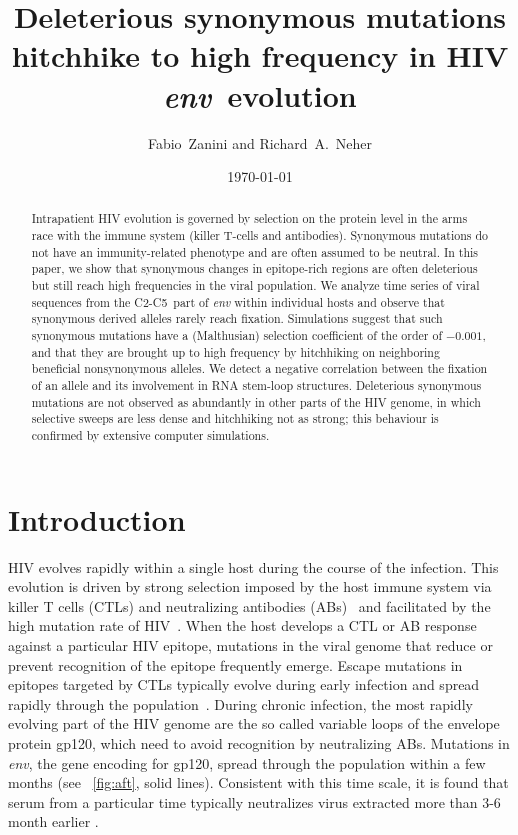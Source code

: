 \documentclass[rmp, twocolumn]{revtex4}
\newcommand{\env}{\textit{env}}
\newcommand{\shankaregion}{C2-C5}
\newcommand{\Author}{Fabio~Zanini and Richard~A.~Neher}
\newcommand{\Title}{Deleterious synonymous mutations hitchhike to high frequency in HIV \env~evolution}
\begin{document}
\title{\Title}
\author{\Author}
\date{\today}

\begin{abstract}
\noindent
Intrapatient HIV evolution is governed by selection on the protein level in the
arms race with the immune system (killer T-cells and antibodies). Synonymous
mutations do not have an immunity-related phenotype and are often assumed to be
neutral. In this paper, we show that synonymous changes in epitope-rich regions
are often deleterious but still reach high frequencies in the viral population.  We analyze time
series of viral sequences from the \shankaregion~part of {\it env} within individual
hosts and observe that synonymous derived alleles rarely reach fixation.
Simulations suggest that such synonymous mutations
have a (Malthusian) selection coefficient of the order of $-0.001$, and that
they are brought up to high frequency by hitchhiking on neighboring beneficial
nonsynonymous alleles. We detect a negative correlation between the fixation of an allele and
its involvement in RNA stem-loop structures.
Deleterious synonymous mutations are not observed as abundantly in other parts of the HIV genome, in which
selective sweeps are less dense and hitchhiking not as strong; this behaviour is
confirmed by extensive computer simulations.

\end{abstract}
\maketitle

\section{Introduction}

HIV evolves rapidly within a single host during the course of the infection.
This evolution is driven by strong selection imposed by the host immune system
via killer T cells (CTLs) and neutralizing antibodies
(ABs)~\citep{rambaut_causes_2004} and facilitated by the high
mutation rate of HIV~\citep{mansky_lower_1995}. When the host develops a CTL or
AB response against a particular HIV epitope, mutations in the viral genome that
reduce or prevent recognition of the epitope frequently emerge. Escape mutations
in epitopes targeted by CTLs typically evolve during early infection and spread
rapidly through the population~\citep{mcmichael_immune_2009}. During chronic
infection, the most rapidly evolving part of the HIV genome are the so called
variable loops of the envelope protein gp120, which need to avoid recognition by
neutralizing ABs.  Mutations in \env, the gene encoding for gp120, spread
through the population within a few months (see \figurename~\ref{fig:aft}, solid
lines). Consistent with this time scale, it is found that serum from a
particular time typically neutralizes virus extracted more than 3-6 month
earlier \citep{richman_rapid_2003}.
\end{document}
